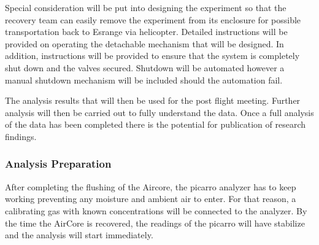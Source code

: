 Special consideration will be put into designing the experiment so that the recovery team can easily remove the experiment from its enclosure for possible transportation back to Esrange via helicopter. Detailed instructions will be provided on operating the detachable mechanism that will be designed. In addition, instructions will be provided to ensure that the system is completely shut down and the valves secured. Shutdown will be automated however a manual shutdown mechanism will be included should the automation fail.

The analysis results that will then be used for the post flight meeting. Further analysis will then be carried out to fully understand the data. Once a full analysis of the data has been completed there is the potential for publication of research findings.


\subsubsection{Analysis Preparation}

After completing the flushing of the Aircore, the picarro analyzer has to keep working preventing any moisture and ambient air to enter. For that reason, a calibrating gas with known concentrations will be connected to the analyzer.  By the time the AirCore is recovered, the readings of the picarro will have stabilize and the analysis will start immediately.   


